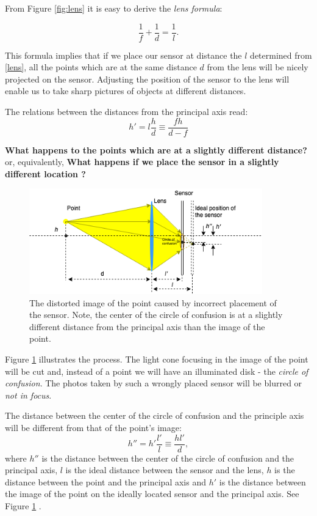 \documentclass[a4paper,10pt]{article}
\begin{document}
From Figure \ref{fig:lens} it is easy to derive the {\it lens formula}:

\begin{equation}
 \frac{1}{f} + \frac{1}{d} = \frac{1}{l}.
 \label{lens}
\end{equation}

This formula implies that if we place our sensor at distance the $l$ determined from \eqref{lens}, all the points which are at the same distance $d$ from the lens will be nicely projected on the sensor. Adjusting the position of the sensor to the lens will enable us to take sharp pictures of objects at different distances. 

The relations between the distances from the principal axis read:
\begin{equation}
h' = l\frac{h}{d}\equiv \frac{fh}{d-f}
\end{equation} 


{\bf What happens to the points which are at a slightly different distance?} or, equivalently,  {\bf What happens if we place the sensor in a slightly different location ?}

\begin{figure}[h]
\centering
 \includegraphics[width=0.9\textwidth]{../../images/lens_confusion_circle.png}
 \caption{The distorted image of the point caused by incorrect placement of the sensor. Note, the center of the circle of confusion is at a slightly different distance from the principal axis than the image of the point.}
 \label{fig:lens_cconf}
\end{figure}

Figure \ref{fig:lens_cconf} illustrates the process. The light cone focusing in the image of the point will be cut and, instead of a point we will have an illuminated disk - the {\it circle of confusion}. The photos taken by such a wrongly placed sensor will be blurred or {\it not in focus}. 

The distance between the center of the circle of confusion and the principle axis will be different from that of the point's image:
\begin{equation}
h'' = h'\frac{l'}{l} \equiv \frac{hl'}{d},
\label{dcirc}
\end{equation} 
where $h''$ is the distance between the center of the circle of confusion and the principal axis, $l$ is the ideal distance between the sensor and the lens, $h$ is the distance between the point and the principal axis and $h'$ is the distance between the image of the point on the ideally located sensor and the principal axis. See Figure \ref{fig:lens_cconf} .
\end{document}
